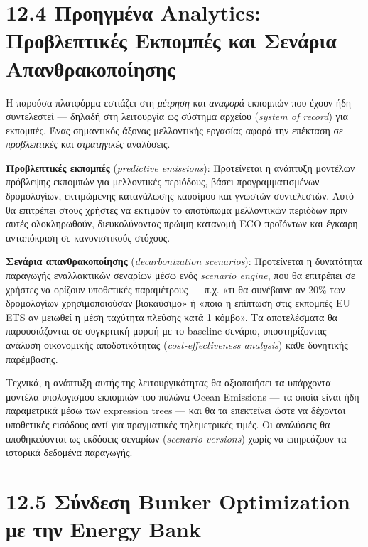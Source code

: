\section{12.4 Προηγμένα Analytics: Προβλεπτικές Εκπομπές και Σενάρια
Απανθρακοποίησης}\label{ux3c0ux3c1ux3bfux3b7ux3b3ux3bcux3adux3bdux3b1-analytics-ux3c0ux3c1ux3bfux3b2ux3bbux3b5ux3c0ux3c4ux3b9ux3baux3adux3c2-ux3b5ux3baux3c0ux3bfux3bcux3c0ux3adux3c2-ux3baux3b1ux3b9-ux3c3ux3b5ux3bdux3acux3c1ux3b9ux3b1-ux3b1ux3c0ux3b1ux3bdux3b8ux3c1ux3b1ux3baux3bfux3c0ux3bfux3afux3b7ux3c3ux3b7ux3c2}

Η παρούσα πλατφόρμα εστιάζει στη \emph{μέτρηση} και \emph{αναφορά}
εκπομπών που έχουν ήδη συντελεστεί --- δηλαδή στη λειτουργία ως σύστημα
αρχείου (\emph{system of record}) για εκπομπές. Ένας σημαντικός άξονας
μελλοντικής εργασίας αφορά την επέκταση σε \emph{προβλεπτικές} και
\emph{στρατηγικές} αναλύσεις.

\textbf{Προβλεπτικές εκπομπές} (\emph{predictive emissions}):
Προτείνεται η ανάπτυξη μοντέλων πρόβλεψης εκπομπών για μελλοντικές
περιόδους, βάσει προγραμματισμένων δρομολογίων, εκτιμώμενης κατανάλωσης
καυσίμου και γνωστών συντελεστών. Αυτό θα επιτρέπει στους χρήστες να
εκτιμούν το αποτύπωμα μελλοντικών περιόδων πριν αυτές ολοκληρωθούν,
διευκολύνοντας πρώιμη κατανομή ECO προϊόντων και έγκαιρη ανταπόκριση σε
κανονιστικούς στόχους.

\textbf{Σενάρια απανθρακοποίησης} (\emph{decarbonization scenarios}):
Προτείνεται η δυνατότητα παραγωγής εναλλακτικών σεναρίων μέσω ενός
\emph{scenario engine}, που θα επιτρέπει σε χρήστες να ορίζουν
υποθετικές παραμέτρους --- π.χ. «τι θα συνέβαινε αν 20\% των δρομολογίων
χρησιμοποιούσαν βιοκαύσιμο» ή «ποια η επίπτωση στις εκπομπές EU ETS αν
μειωθεί η μέση ταχύτητα πλεύσης κατά 1 κόμβο». Τα αποτελέσματα θα
παρουσιάζονται σε συγκριτική μορφή με το baseline σενάριο,
υποστηρίζοντας ανάλυση οικονομικής αποδοτικότητας
(\emph{cost-effectiveness analysis}) κάθε δυνητικής παρέμβασης.

Τεχνικά, η ανάπτυξη αυτής της λειτουργικότητας θα αξιοποιήσει τα
υπάρχοντα μοντέλα υπολογισμού εκπομπών του πυλώνα Ocean Emissions --- τα
οποία είναι ήδη παραμετρικά μέσω των expression trees --- και θα τα
επεκτείνει ώστε να δέχονται υποθετικές εισόδους αντί για πραγματικές
τηλεμετρικές τιμές. Οι αναλύσεις θα αποθηκεύονται ως εκδόσεις σεναρίων
(\emph{scenario versions}) χωρίς να επηρεάζουν τα ιστορικά δεδομένα
παραγωγής.

\section{12.5 Σύνδεση Bunker Optimization με την Energy
Bank}\label{ux3c3ux3cdux3bdux3b4ux3b5ux3c3ux3b7-bunker-optimization-ux3bcux3b5-ux3c4ux3b7ux3bd-energy-bank}


